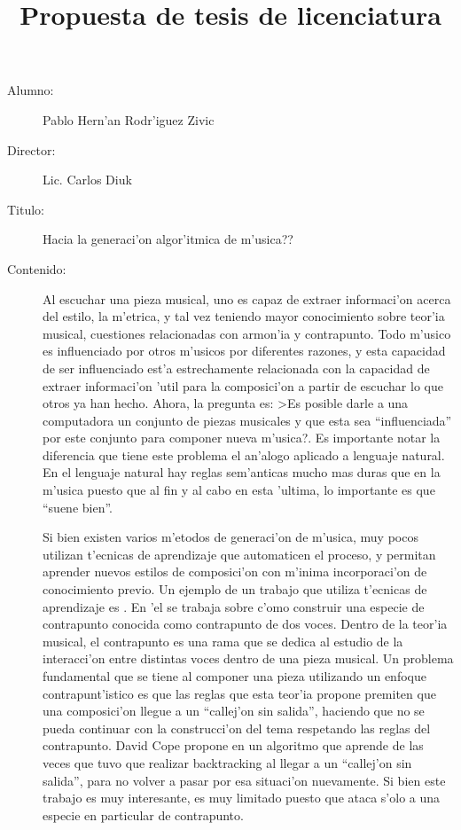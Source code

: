 \documentclass[a4paper,10pt]{article}
\title{Propuesta de tesis de licenciatura}
\begin{document}
\maketitle
 \begin{description}
  \item[Alumno:] Pablo Hern'an Rodr'iguez Zivic
  \item[Director:] Lic. Carlos Diuk
  \item[Titulo:] Hacia la generaci'on algor'itmica de m'usica??
  \item[Contenido:] Al escuchar una pieza musical, uno es capaz de extraer informaci'on acerca del 
	estilo, la m'etrica, y tal vez teniendo mayor conocimiento sobre teor'ia musical, cuestiones relacionadas 
	con armon'ia y contrapunto. Todo m'usico es influenciado por otros m'usicos por diferentes razones, 
	y esta capacidad de ser influenciado est'a estrechamente relacionada con la capacidad de extraer 
	informaci'on 'util para la composici'on a partir de escuchar lo que otros ya han hecho.
	Ahora, la pregunta es: >Es posible darle a una computadora un conjunto de piezas musicales y que esta sea 
	``influenciada'' por este conjunto para componer nueva m'usica?. Es importante notar la diferencia que 
	tiene este problema el an'alogo aplicado a lenguaje natural. En el lenguaje natural hay reglas sem'anticas
	mucho mas duras que en la m'usica puesto que al fin y al cabo en esta 'ultima, lo importante es que 
	``suene bien''.
	

	Si bien existen varios m'etodos de generaci'on de m'usica, muy pocos utilizan t'ecnicas de aprendizaje 
	que automaticen el proceso, y permitan aprender nuevos estilos de composici'on con m'inima
	incorporaci'on de conocimiento previo. Un ejemplo de un trabajo que utiliza t'ecnicas de aprendizaje es 
	\cite{DaCo}. En 'el se trabaja sobre c'omo construir una especie de contrapunto conocida como contrapunto 
	de dos voces. Dentro de la teor'ia musical, el contrapunto es una rama que se dedica al estudio de la 
	interacci'on entre distintas voces dentro de una pieza musical. Un problema fundamental que se tiene 
	al componer una pieza utilizando un enfoque contrapunt'istico es que las reglas que esta teor'ia propone 
	premiten que una composici'on llegue a un ``callej'on sin salida'', haciendo que no se pueda continuar 
	con la construcci'on del tema respetando las reglas del contrapunto. David Cope propone en \cite{DaCo} 
	un algoritmo que aprende de las veces que tuvo que realizar backtracking al llegar a un ``callej'on sin 
	salida'', para no volver a pasar por esa situaci'on nuevamente. Si bien este trabajo es muy
	interesante, es muy limitado puesto que ataca s'olo a una especie en particular de contrapunto.
	 

\end{description}
\end{document}
